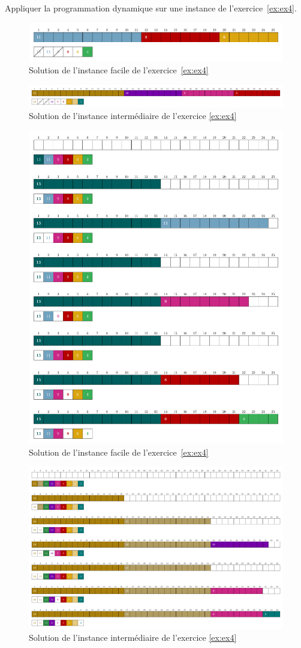\documentclass[11pt]{article}
\begin{document}
   \begin{exercice}{}
    \label{ex:ex3}
    Appliquer la programmation dynamique sur une instance de l'exercice~\ref{ex:ex4}.\\
  \end{exercice}

\begin{figure}[htbp]
    \centering
    \includegraphics[width=0.6\linewidth]{ex3-6-DP.pdf}
    \caption{Solution de l'instance facile de l'exercice~\ref{ex:ex4}}
  \end{figure}

  \begin{figure}[htbp]
    \centering
    \includegraphics[width=0.6\linewidth]{ex3-9-DP.pdf}
    \caption{Solution de l'instance intermédiaire de l'exercice \ref{ex:ex4}}
  \end{figure}

\begin{figure}[htbp]
    \centering
    \includegraphics[width=0.6\linewidth]{ex3-6-TG.pdf}
    \caption{Solution de l'instance facile de l'exercice~\ref{ex:ex4}}
  \end{figure}

  \begin{figure}[htbp]
    \centering
    \includegraphics[width=0.6\linewidth]{ex3-9-TG.pdf}
    \caption{Solution de l'instance intermédiaire de l'exercice \ref{ex:ex4}}
  \end{figure}
\end{document}
